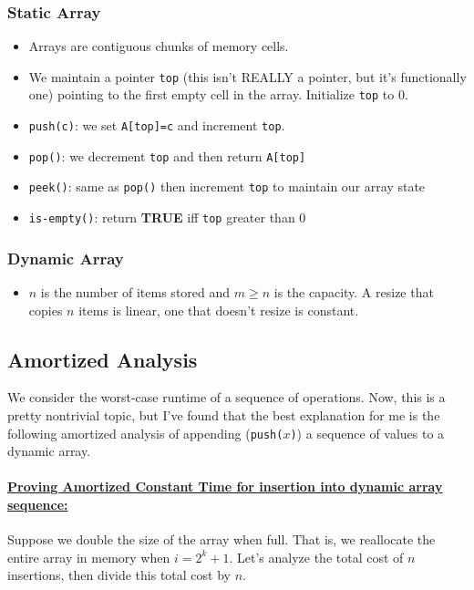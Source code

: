 \documentclass[11pt]{article}
\begin{document}
\subsubsection{Static Array}
\begin{itemize}
    \item Arrays are contiguous chunks of memory cells.
    \item We maintain a pointer \texttt{top} (this isn't REALLY a pointer, but it's functionally one)
        pointing to the first empty cell in the array. Initialize \texttt{top} to 0.
    \item \texttt{push(c)}: we set \texttt{A[top]=c} and increment \texttt{top}.
    \item \texttt{pop()}: we decrement \texttt{top} and then return \texttt{A[top]}
    \item \texttt{peek()}: same as \texttt{pop()} then increment \texttt{top} to maintain our array
        state
    \item \texttt{is-empty()}: return \textbf{TRUE} iff \texttt{top} greater than 0
\end{itemize}

\subsubsection{Dynamic Array}
\begin{itemize}
    \item $n$ is the number of items stored and $m \geq n$ is the capacity. A resize that copies $n$
        items is linear, one that doesn't resize is constant.
\end{itemize}

\subsection{Amortized Analysis}
We consider the worst-case runtime of a sequence of operations. Now, this is a pretty nontrivial
topic, but I've found that the best explanation for me is the following amortized analysis of
appending (\texttt{push($x$)}) a sequence of values to a dynamic array.


\paragraph{\href{https://courses.cs.duke.edu/spring19/compsci330/lecture21scribe.pdf}{Proving Amortized Constant Time for insertion into dynamic array sequence:}}
Suppose we double the size of the array when full.  That is, we reallocate the entire array in memory when $i=2^k+1$. Let's analyze the total cost of $n$ insertions, then divide this total cost by $n$.
\end{document}
